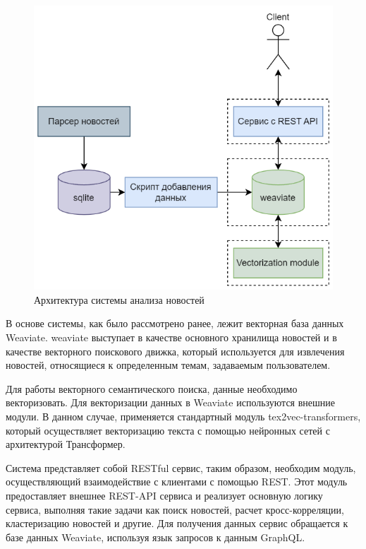 \begin{figure}[h]
    \centering
    \includegraphics{images/system-architecture.png}
    \caption{Архитектура системы анализа новостей}
    \label{img:system-architecture}
\end{figure}

В основе системы, как было рассмотрено ранее, лежит векторная база данных Weaviate. weaviate выступает в качестве основного хранилища новостей и в качестве векторного поискового движка, который используется для извлечения новостей, относящиеся к определенным темам, задаваемым пользователем.

Для работы векторного семантического поиска, данные необходимо векторизовать. Для векторизации данных в Weaviate используются внешние модули. В данном случае, применяется стандартный модуль tex2vec-transformers, который осуществляет векторизацию текста с помощью нейронных сетей с архитектурой Трансформер.

Система представляет собой RESTful сервис, таким образом, необходим модуль, осуществляющий взаимодействие с клиентами с помощью REST. Этот модуль предоставляет внешнее REST-API сервиса и реализует основную логику сервиса, выполняя такие задачи как поиск новостей, расчет кросс-корреляции, кластеризацию новостей и другие. Для получения данных сервис обращается к базе данных Weaviate, используя язык запросов к данным GraphQL.

